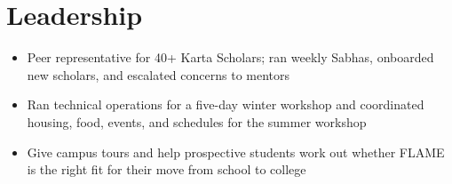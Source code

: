 \section{Leadership}
\begin{itemize}
  \item Peer representative for 40+ Karta Scholars; ran weekly Sabhas, onboarded new scholars, and escalated concerns to mentors
  \item Ran technical operations for a five-day winter workshop and coordinated housing, food, events, and schedules for the summer workshop
\end{itemize}
\begin{itemize}
  \item Give campus tours and help prospective students work out whether FLAME is the right fit for their move from school to college
\end{itemize}

